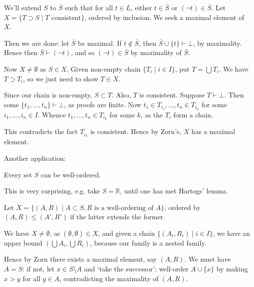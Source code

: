 \documentclass[12pt]{article}
\begin{document}
\begin{proofbox}
	We'll extend $S$ to $\bar S$ such that for all $t \in L$, either $t \in \bar S$ or $(\neg t) \in \bar S$. Let $X = \{T \supset S \mid T \text{ consistent}\}$, ordered by inclusion. We seek a maximal element of $X$.

	Then we are done: let $\bar S$ be maximal. If $t \not \in \bar S$, then $\bar S \cup \{t\} \vdash \bot$, by maximality. Hence then $\bar S \vdash (\neg t)$, and so $(\neg t) \in \bar S$ by maximality of $\bar S$.

	Now $X \neq \emptyset$ as $S \in X$. Given non-empty chain $\{T_i \mid i \in I\}$, put $T = \bigcup T_i$. We have $T \supset T_i$, so we just need to show $T \in X$.

	Since our chain is non-empty, $S \subset T$. Also, $T$ is consistent. Suppose $T \vdash \bot$. Then some $\{t_1, \ldots, t_n\} \vdash \bot$, as proofs are finite. Now  $t_1 \in T_{i_1}, \ldots, t_n \in T_{i_n}$ for some $i_1, \ldots, i_n \in I$. Whence $t_1, \ldots, t_n \in T_{i_k}$ for some $k$, as the $T_i$ form a chain.

	This contradicts the fact $T_{i_k}$ is consistent. Hence by Zorn's, $X$ has a maximal element.
\end{proofbox}

Another application:

\begin{theorem}
	Every set $S$ can be well-ordered.
\end{theorem}

\begin{remark}
	This is very surprising, e.g. take $S = \mathbb{R}$, until one has met Hartogs' lemma.
\end{remark}

\begin{proofbox}
	Let $X = \{(A, R) \mid A \subset S, R \text{ is a well-ordering of } A\}$, ordered by $(A, R) \leq (A', R')$ if the latter extends the former.

	We have $X \neq \emptyset$, as $(\emptyset, \emptyset) \in X$, and given a chain $\{(A_i, R_i) \mid i \in I\}$, we have an upper bound $(\bigcup A_i, \bigcup R_i)$, because our family is a nested family.

	Hence by Zorn there exists a maximal element, say $(A, R)$. We must have $A = S$: if not, let $x \in S \setminus A$ and `take the successor': well-order $A \cup \{x\}$ by making $x > y$ for all $y \in A$, contradicting the maximality of $(A, R)$.
\end{proofbox}
\end{document}
